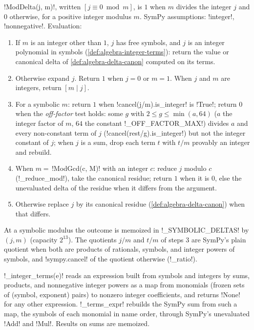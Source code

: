 \begin{definition}[Delta]\label{def:algebra-moddelta}
\py!ModDelta(j, m)!, written $[j\equiv 0 \bmod m]$, is $1$ when $m$ divides the integer $j$ and $0$ otherwise, for a positive integer modulus $m$. SymPy assumptions: \code!integer!, \code!nonnegative!. Evaluation:
\begin{enumerate}
\item If $m$ is an integer other than $1$, $j$ has free symbols, and $j$ is an integer polynomial in symbols (\cref{def:algebra-integer-terms}): return the value or canonical delta of \cref{def:algebra-delta-canon} computed on its terms.
\item Otherwise expand $j$. Return $1$ when $j=0$ or $m=1$. When $j$ and $m$ are integers, return $[m\mid j]$.
\item For a symbolic $m$: return $1$ when \py!cancel(j/m).is_integer! is \py!True!; return $0$ when the \emph{off-factor} test holds: some $g$ with $2\le g\le\min(a,64)$ ($a$ the integer factor of $m$, $64$ the constant \py!_OFF_FACTOR_MAX!) divides $a$ and every non-constant term of $j$ (\py!cancel(rest/g).is_integer!) but not the integer constant of $j$; when $j$ is a sum, drop each term $t$ with $t/m$ provably an integer and rebuild.
\item When $m=$\,\py!ModGcd(c, M)! with an integer $c$: reduce $j$ modulo $c$ (\py!_reduce_mod!), take the canonical residue; return $1$ when it is $0$, else the unevaluated delta of the residue when it differs from the argument.
\item Otherwise replace $j$ by its canonical residue (\cref{def:algebra-delta-canon}) when that differs.
\end{enumerate}
At a symbolic modulus the outcome is memoized in \py!_SYMBOLIC_DELTAS! by $(j,m)$ (capacity $2^{13}$). The quotients $j/m$ and $t/m$ of steps 3 are SymPy's plain quotient when both are products of rationals, symbols, and integer powers of symbols, and \py!sympy.cancel! of the quotient otherwise (\py!_ratio!).
\end{definition}

\begin{definition}\label{def:algebra-integer-terms}
\py!_integer_terms(e)! reads an expression built from symbols and integers by sums, products, and nonnegative integer powers as a map from monomials (frozen sets of (symbol, exponent) pairs) to nonzero integer coefficients, and returns \py!None! for any other expression. \py!_terms_expr! rebuilds the SymPy sum from such a map, the symbols of each monomial in name order, through SymPy's unevaluated \py!Add! and \py!Mul!. Results on sums are memoized.
\end{definition}

